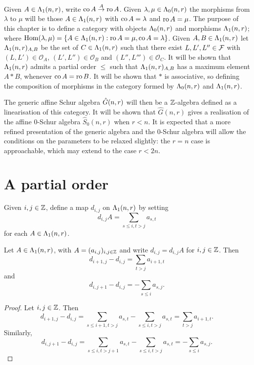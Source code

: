 \documentclass[a4paper, 11pt]{report}
\begin{document}
Given $A\in\Lambda_1(n,r)$, write $\operatorname{co}{A}\stackrel{A}{\to}\operatorname{ro}{A}$. Given $\lambda,\mu\in\Lambda_0(n,r)$ the morphisms from $\lambda$ to $\mu$ will be those $A\in\Lambda_1(n,r)$ with $\operatorname{co}{A} = \lambda$ and $\operatorname{ro}{A} = \mu$. The purpose of this chapter is to define a category with objects $\Lambda_0(n,r)$ and morphisms $\Lambda_1(n,r)$; where $\operatorname{Hom}(\lambda,\mu) = \{A\in\Lambda_1(n,r): \operatorname{ro}{A}=\mu,\operatorname{co}{A}=\lambda\}$. Given $A,B\in\Lambda_1(n,r)$ let $\Lambda_1(n,r)_{A,B}$ be the set of $C\in\Lambda_1(n,r)$ such that there exist $L,L',L''\in\mathcal{F}$ with $(L,L')\in\mathcal{O}_A$, $(L',L'')\in\mathcal{O}_B$ and $(L'',L''')\in\mathcal{O}_C$. It will be shown that $\Lambda_1(n,r)$ admits a partial order $\le$ such that $\Lambda_1(n,r)_{A,B}$ has a maximum element $A\ast B$, whenever $\operatorname{co}{A} = \operatorname{ro}{B}$. It will be shown that $\ast$ is associative, so defining the composition of morphisms in the category formed by $\Lambda_0(n,r)$ and $\Lambda_1(n,r)$.

The generic affine Schur algebra $\hat{G}(n,r)$ will then be a $\mathbb{Z}$-algebra defined as a linearisation of this category. It will be shown that $\hat{G}(n,r)$ gives a realisation of the affine $0$-Schur algebra $\hat{S}_0(n,r)$ when $r<n$. It is expected that a more refined presentation of the generic algebra and the 0-Schur algebra will allow the conditions on the parameters to be relaxed slightly: the $r=n$ case is approachable, which may extend to the case $r<2n$.

\section{A partial order}

Given $i,j\in\mathbb{Z}$, define a map $d_{i,j}$ on $\Lambda_1(n,r)$ by setting
\begin{equation*}
d_{i,j}A = \sum_{s\le i,t>j} a_{s,t}
\end{equation*}
for each $A\in\Lambda_1(n,r)$.

\begin{lemma}\label{lemma:differentials}
Let $A\in\Lambda_1(n,r)$, with $A=(a_{i,j})_{i,j\in\mathbb{Z}}$ and write $d_{i,j} = d_{i,j}A$ for $i,j\in\mathbb{Z}$. Then
\begin{equation*}
d_{i+1,j} - d_{i,j} = \sum_{t>j}a_{i+1,t}
\end{equation*}
and
\begin{equation*}
d_{i,j+1}-d_{i,j} = - \sum_{s\le i}a_{s,j}.
\end{equation*}
\end{lemma}

\begin{proof}
Let $i,j\in\mathbb{Z}$. Then
\begin{equation*}
d_{i+1,j} - d_{i,j} = \sum_{s\le i+1,t>j}a_{s,t} - \sum_{s\le i,t>j}a_{s,t} = \sum_{t>j}a_{i+1,t}.
\end{equation*}
Similarly,
\begin{equation*}
d_{i,j+1}-d_{i,j} = \sum_{s\le i,t>j+1}a_{s,t} - \sum_{s\le i,t>j}a_{s,t} = -\sum_{s\le i}a_{s,j}.
\end{equation*}
\end{proof}
\end{document}
